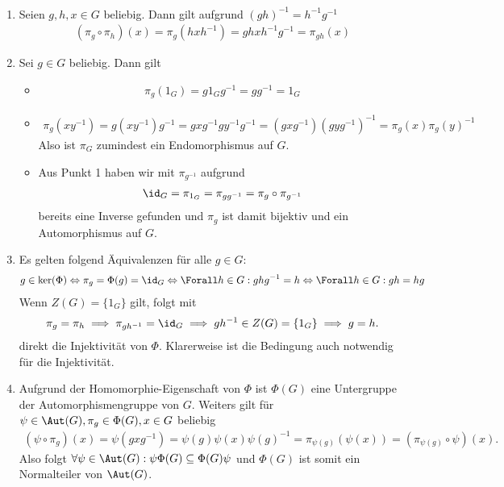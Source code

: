 \begin{solution}
\leavevmode \\
\begin{enumerate}
  \item Seien $g,h,x \in G$ beliebig. Dann gilt aufgrund $(gh)^{-1} = h^{-1}g^{-1}$
  \begin{align*}
    (\pi_g \circ \pi_h)(x) = \pi_g(hxh^{-1}) = ghxh^{-1}g^{-1} = \pi_{gh}(x)
  \end{align*}
  \item Sei $g \in G$ beliebig. Dann gilt
  \begin{itemize}
    \item \begin{align*}
      \pi_g(1_G) = g1_Gg^{-1} = gg^{-1} = 1_G
    \end{align*}
    \item \begin{align*}
      \pi_g(xy^{-1}) = g(xy^{-1})g^{-1} =  gxg^{-1}gy^{-1}g^{-1} =  (gxg^{-1})(gyg^{-1})^{-1} = \pi_g(x)\pi_g(y)^{-1}
    \end{align*}
    Also ist $\pi_G$ zumindest ein Endomorphismus auf $G$.
    \item Aus Punkt 1 haben wir mit $\pi_{g^{-1}}$ aufgrund
    \begin{align*}
      \id_G = \pi_{1_G} = \pi_{gg^{-1}} = \pi_g \circ \pi_{g^{-1}}
    \end{align*}
    bereits eine Inverse gefunden und $\pi_g$ ist damit bijektiv und ein Automorphismus auf $G$.
  \end{itemize}
\item Es gelten folgend Äquivalenzen für alle $g \in G$:
\begin{align*}
  g \in \ker (\Phi) \Leftrightarrow \pi_g = \Phi (g) = \id_G \Leftrightarrow \Forall h \in G: ghg^{-1} = h \Leftrightarrow \Forall h \in G: gh = hg 
\end{align*}
Wenn $Z(G) = \{1_G\}$ gilt, folgt mit
\begin{align*}
  \pi_g = \pi_h \implies \pi_{gh^{-1}} = \id_G \implies gh^{-1} \in Z(G) = \{1_G\} \implies g = h.
\end{align*}
direkt die Injektivität von $\Phi$. Klarerweise ist die Bedingung auch notwendig für die Injektivität.
\item Aufgrund der Homomorphie-Eigenschaft von $\Phi$ ist $\Phi(G)$ eine Untergruppe
der Automorphismengruppe von $G$. Weiters gilt für $\psi \in \Aut(G), \pi_g \in \Phi(G), x\in G$ beliebig
\begin{align*}
  (\psi \circ \pi_g) (x)= \psi(gxg^{-1}) = \psi(g)\psi(x)\psi(g)^{-1} = \pi_{\psi(g)}(\psi(x)) = (\pi_{\psi(g)} \circ \psi)(x).
\end{align*}
Also folgt $\forall \psi \in \Aut(G): \psi\Phi(G) \subseteq \Phi(G)\psi$ und $\Phi(G)$ ist somit ein Normalteiler von $\Aut(G)$.
\end{enumerate}

\end{solution}
